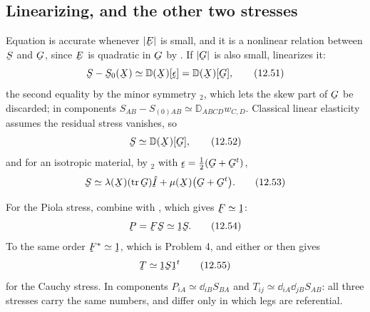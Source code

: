 \subsection*{Linearizing, and the other two stresses}

Equation  is accurate whenever $|\bE|$ is small, and it is a
nonlinear relation between $\bS$ and $\bG$, since $\bE$ is quadratic in
$\bG$ by . If $|\bG|$ is also small,  linearizes it:
\begin{equation}
   \bS-\bS_{0}(\bX)\simeq\mathbb{D}(\bX)[\vek{\epsilon}]
   =\mathbb{D}(\bX)[\bG],
   \tag{12.51}\label{eq:12.51}
\end{equation}
the second equality by the minor symmetry $_{2}$, which lets
the skew part of $\bG$ be discarded; in components
$S_{AB}-S_{(0)AB}\simeq\mathbb{D}_{ABCD}w_{C,D}$. Classical linear
elasticity assumes the residual stress vanishes, so
\begin{equation}
   \bS\simeq\mathbb{D}(\bX)[\bG],
   \tag{12.52}\label{eq:12.52}
\end{equation}
and for an isotropic material, by $_{2}$ with
$\vek{\epsilon}=\tfrac12(\bG+\bG^{t})$,
\begin{equation}
   \bS\simeq\lambda(\bX)(\tr\bG)\hI+\mu(\bX)\big(\bG+\bG^{t}\big).
   \tag{12.53}\label{eq:12.53}
\end{equation}

For the Piola stress, combine  with , which gives
$\bF\simeq\shift$:
\begin{equation}
   \bP=\bF\bS\simeq\shift\bS .
   \tag{12.54}\label{eq:12.54}
\end{equation}
To the same order $\bF^{*}\simeq\shift$, which is Problem 4, and either
 or  then gives
\begin{equation}
   \bT\simeq\shift\bS\shift^{t}
   \tag{12.55}\label{eq:12.55}
\end{equation}
for the Cauchy stress. In components $P_{iA}\simeq\dd_{iB}S_{BA}$ and
$T_{ij}\simeq\dd_{iA}\dd_{jB}S_{AB}$: all three stresses carry the same
numbers, and differ only in which legs are referential.

